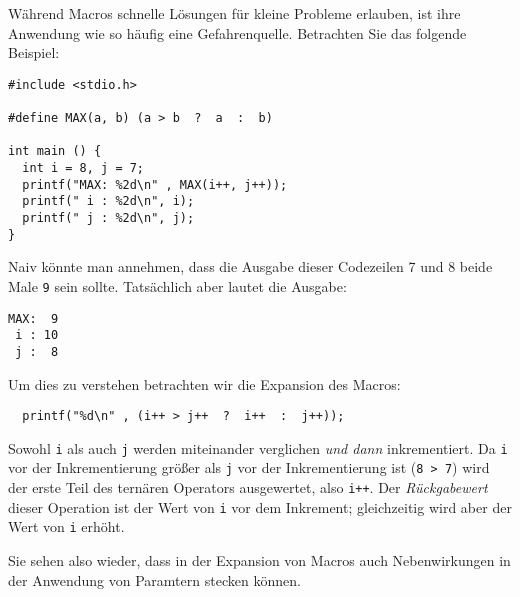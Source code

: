\begin{warnbox}
Während Macros schnelle Lösungen für kleine Probleme erlauben, ist ihre Anwendung wie so häufig eine Gefahrenquelle. Betrachten Sie das folgende Beispiel:
\begin{codebox}
\begin{verbatim}
#include <stdio.h>

#define MAX(a, b) (a > b  ?  a  :  b)

int main () {
  int i = 8, j = 7;
  printf("MAX: %2d\n" , MAX(i++, j++));
  printf(" i : %2d\n", i);
  printf(" j : %2d\n", j);
}
\end{verbatim}
\end{codebox}

Naiv könnte man annehmen, dass die Ausgabe dieser Codezeilen 7 und 8 beide Male \texttt{9} sein sollte. Tatsächlich aber lautet die Ausgabe:

\begin{cmdbox}
\begin{verbatim}
MAX:  9
 i : 10
 j :  8
\end{verbatim}
\end{cmdbox}

Um dies zu verstehen betrachten wir die Expansion des Macros:
\begin{codebox}
\begin{verbatim}
  printf("%d\n" , (i++ > j++  ?  i++  :  j++));
\end{verbatim}
\end{codebox}

Sowohl \texttt{i} als auch \texttt{j} werden miteinander verglichen \emph{und dann} inkrementiert. Da \texttt{i} vor der Inkrementierung größer als \texttt{j} vor der Inkrementierung ist (\texttt{8 > 7}) wird der erste Teil des ternären Operators ausgewertet, also \texttt{i++}. Der \emph{Rückgabewert} dieser Operation ist der Wert von \texttt{i} vor dem Inkrement; gleichzeitig wird aber der Wert von \texttt{i} erhöht.

Sie sehen also wieder, dass in der Expansion von Macros auch Nebenwirkungen in der Anwendung von Paramtern stecken können.
\end{warnbox}

